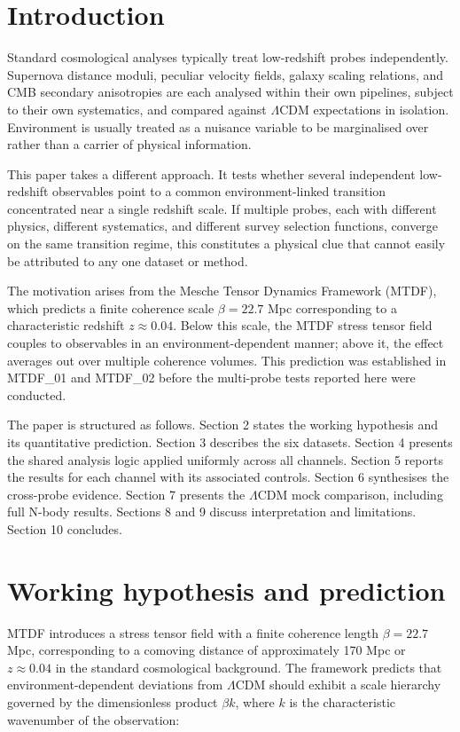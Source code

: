 \documentclass[11pt,a4paper]{article}
\begin{document}
\tableofcontents

\section{Introduction}
\label{sec:sec1}
Standard cosmological analyses typically treat low-redshift probes independently. Supernova distance moduli, peculiar velocity fields, galaxy scaling relations, and CMB secondary anisotropies are each analysed within their own pipelines, subject to their own systematics, and compared against \(\Lambda\)CDM expectations in isolation. Environment is usually treated as a nuisance variable to be marginalised over rather than a carrier of physical information.

This paper takes a different approach. It tests whether several independent low-redshift observables point to a common environment-linked transition concentrated near a single redshift scale. If multiple probes, each with different physics, different systematics, and different survey selection functions, converge on the same transition regime, this constitutes a physical clue that cannot easily be attributed to any one dataset or method.

The motivation arises from the Mesche Tensor Dynamics Framework (MTDF), which predicts a finite coherence scale \(\beta = 22.7\) Mpc corresponding to a characteristic redshift \(z \approx 0.04\). Below this scale, the MTDF stress tensor field couples to observables in an environment-dependent manner; above it, the effect averages out over multiple coherence volumes. This prediction was established in MTDF\_\allowbreak{}01 and MTDF\_\allowbreak{}02 before the multi-probe tests reported here were conducted.

The paper is structured as follows. Section 2 states the working hypothesis and its quantitative prediction. Section 3 describes the six datasets. Section 4 presents the shared analysis logic applied uniformly across all channels. Section 5 reports the results for each channel with its associated controls. Section 6 synthesises the cross-probe evidence. Section 7 presents the \(\Lambda\)CDM mock comparison, including full N-body results. Sections 8 and 9 discuss interpretation and limitations. Section 10 concludes.

\section{Working hypothesis and prediction}
\label{sec:sec2}
MTDF introduces a stress tensor field with a finite coherence length \(\beta = 22.7\) Mpc, corresponding to a comoving distance of approximately 170 Mpc or \(z \approx 0.04\) in the standard cosmological background. The framework predicts that environment-dependent deviations from \(\Lambda\)CDM should exhibit a scale hierarchy governed by the dimensionless product \(\beta k\), where \(k\) is the characteristic wavenumber of the observation:
\end{document}
